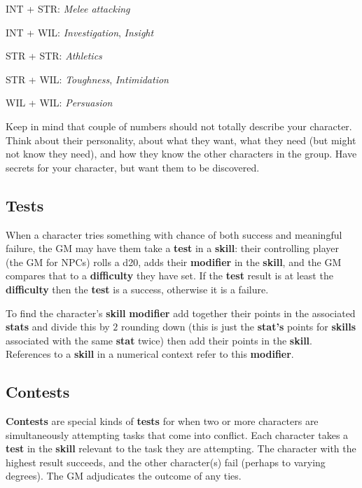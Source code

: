 \documentclass[11pt]{article}
\begin{document}
\begin{multicols}{3}
\begin{multicols}{2}
    INT + STR: ​\textit{Melee attacking}

    INT + WIL: \textit{Investigation}, \textit{Insight}

    STR + STR: \textit{​Athletics}

    STR + WIL: \textit{​Toughness}, \textit{Intimidation}

    WIL + WIL: ​\textit{Persuasion}
  \end{multicols}

  Keep in mind that couple of numbers should not totally describe your
  character. Think about their personality, about what they want, what they need
  (but might not know they need), and how they know the other characters in the
  group. Have secrets for your character, but want them to be discovered.

  \subsection*{Tests}

  When a character tries something with chance of both success and meaningful
  failure, the GM may have them take a \textbf{​test}​ in a \textbf{skill}: their
  controlling player (the GM for NPCs) rolls a d20, adds their \textbf{modifier}
  in the \textbf{skill}, and the GM compares that to a \textbf{difficulty} they
  have set. If the \textbf{test} result is at least the \textbf{difficulty} then
  the \textbf{test} is a success, otherwise it is a failure.

  To find the character's \textbf{skill} \textbf{modifier} add together their
  points in the associated \textbf{stats} and divide this by $2$ rounding down
  (this is just the \textbf{stat's} points for \textbf{skills} associated with
  the same \textbf{stat} twice) then add their points in the \textbf{skill}.
  References to a \textbf{skill} in a numerical context refer to this
  \textbf{modifier}.

  \subsection*{Contests}

  \textbf{Contests} are special kinds of \textbf{tests} for when two or more
  characters are simultaneously attempting tasks that come into conflict. Each
  character takes a \textbf{test} in the \textbf{skill} relevant to the task
  they are attempting. The character with the highest result succeeds, and the
  other character(s) fail (perhaps to varying degrees). The GM adjudicates the
  outcome of any ties.


\end{multicols}
\end{document}
